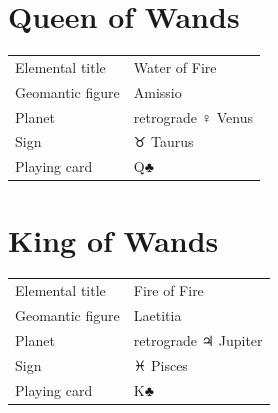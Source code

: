 \newpage
\section*{Queen of Wands}

\begin{center}
\end{center}

\vspace{4mm}
\noindent\begin{tabular}{@{}l@{\quad}l@{}}
Elemental title & Water of Fire \\
Geomantic figure & Amissio \\
Planet & retrograde {\symbfont ♀} Venus \\
Sign & {\symbfont ♉} Taurus \\
Playing card & Q♣ \\
\end{tabular}

\newpage
\section*{King of Wands}

\begin{center}
\end{center}

\vspace{4mm}
\noindent\begin{tabular}{@{}l@{\quad}l@{}}
Elemental title & Fire of Fire \\
Geomantic figure & Laetitia \\
Planet & retrograde {\symbfont ♃} Jupiter \\
Sign & {\symbfont ♓} Pisces \\
Playing card & K♣ \\
\end{tabular}
